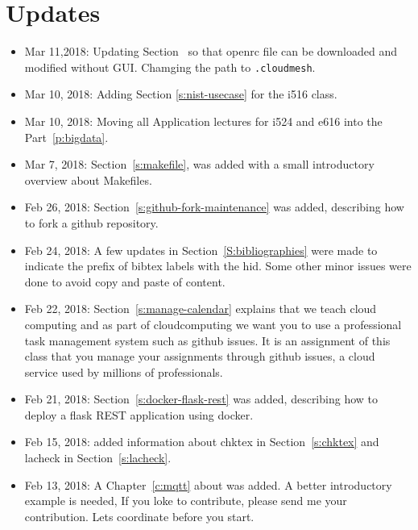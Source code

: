 
\chapter{Updates}


\begin{itemize}

\item Mar 11,2018: Updating Section~\label{s:chameleon-openstack} so
  that openrc file can be downloaded and modified without
  GUI. Chamging the path to \verb|.cloudmesh|.

\item Mar 10, 2018: Adding Section \ref{s:nist-usecase} for the i516 class.

\item Mar 10, 2018: Moving all Application lectures for i524 and e616
  into the Part~\ref{p:bigdata}.

\item Mar 7, 2018: Section~\ref{s:makefile}, was added with a small
  introductory overview about Makefiles.

\item Feb 26, 2018: Section~\ref{s:github-fork-maintenance} was added,
  describing how to fork a github repository.

\item Feb 24, 2018: A few updates in Section~\ref{S:bibliographies}
  were made to indicate the prefix of bibtex labels with the hid. Some
  other minor issues were done to avoid copy and paste of content.

\item Feb 22, 2018: Section~\ref{s:manage-calendar} explains that we
  teach cloud computing and as part of cloudcomputing we want you to
  use a professional task management system such as github issues. It
  is an assignment of this class that you manage your assignments
  through github issues, a cloud service used by millions of
  professionals.

\item Feb 21, 2018: Section~\ref{s:docker-flask-rest} was added,
    describing  how to deploy a flask REST
    application using docker. 

\item Feb 15, 2018: added information about chktex in
  Section~\ref{s:chktex} and lacheck in Section~\ref{s:lacheck}.

\item Feb 13, 2018: A Chapter~\ref{c:mqtt} about was added. A better
  introductory example is needed, If you loke to contribute, please
  send me your contribution. Lets coordinate before you start.


\end{itemize}
